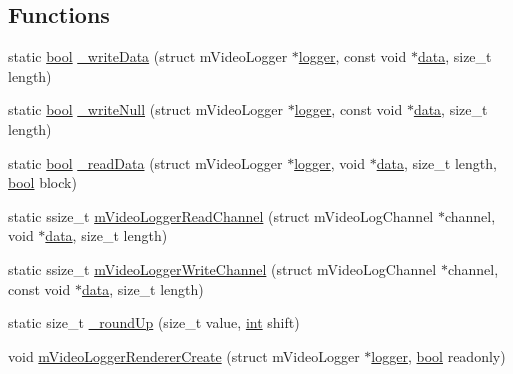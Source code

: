\subsection*{Functions}
\begin{DoxyCompactItemize}
\item 
static \mbox{\hyperlink{libretro_8h_a4a26dcae73fb7e1528214a068aca317e}{bool}} \mbox{\hyperlink{video-logger_8c_a163afd173e5992530065bb8ddc2b693e}{\+\_\+write\+Data}} (struct m\+Video\+Logger $\ast$\mbox{\hyperlink{libretro_8c_a370b093d59813e9620a3b73b831162c2}{logger}}, const void $\ast$\mbox{\hyperlink{libretro_8c_a735984d41155bc1032e09bece8f8d66d}{data}}, size\+\_\+t length)
\item 
static \mbox{\hyperlink{libretro_8h_a4a26dcae73fb7e1528214a068aca317e}{bool}} \mbox{\hyperlink{video-logger_8c_a2bb793afc8d7e37b65be24d0c0198d13}{\+\_\+write\+Null}} (struct m\+Video\+Logger $\ast$\mbox{\hyperlink{libretro_8c_a370b093d59813e9620a3b73b831162c2}{logger}}, const void $\ast$\mbox{\hyperlink{libretro_8c_a735984d41155bc1032e09bece8f8d66d}{data}}, size\+\_\+t length)
\item 
static \mbox{\hyperlink{libretro_8h_a4a26dcae73fb7e1528214a068aca317e}{bool}} \mbox{\hyperlink{video-logger_8c_abcbab73349348e3342c1e7255ed55ee4}{\+\_\+read\+Data}} (struct m\+Video\+Logger $\ast$\mbox{\hyperlink{libretro_8c_a370b093d59813e9620a3b73b831162c2}{logger}}, void $\ast$\mbox{\hyperlink{libretro_8c_a735984d41155bc1032e09bece8f8d66d}{data}}, size\+\_\+t length, \mbox{\hyperlink{libretro_8h_a4a26dcae73fb7e1528214a068aca317e}{bool}} block)
\item 
static ssize\+\_\+t \mbox{\hyperlink{video-logger_8c_aad574cf14798e8c2e42090aa1378c7fe}{m\+Video\+Logger\+Read\+Channel}} (struct m\+Video\+Log\+Channel $\ast$channel, void $\ast$\mbox{\hyperlink{libretro_8c_a735984d41155bc1032e09bece8f8d66d}{data}}, size\+\_\+t length)
\item 
static ssize\+\_\+t \mbox{\hyperlink{video-logger_8c_a4ff0364da23c84ee35e9e6cd4118a1bb}{m\+Video\+Logger\+Write\+Channel}} (struct m\+Video\+Log\+Channel $\ast$channel, const void $\ast$\mbox{\hyperlink{libretro_8c_a735984d41155bc1032e09bece8f8d66d}{data}}, size\+\_\+t length)
\item 
static size\+\_\+t \mbox{\hyperlink{video-logger_8c_a18aadf02a7a40b898d4b6d362af0e06a}{\+\_\+round\+Up}} (size\+\_\+t value, \mbox{\hyperlink{ioapi_8h_a787fa3cf048117ba7123753c1e74fcd6}{int}} shift)
\item 
void \mbox{\hyperlink{video-logger_8c_ad61ee4a99ebbf8066988b0da02c69838}{m\+Video\+Logger\+Renderer\+Create}} (struct m\+Video\+Logger $\ast$\mbox{\hyperlink{libretro_8c_a370b093d59813e9620a3b73b831162c2}{logger}}, \mbox{\hyperlink{libretro_8h_a4a26dcae73fb7e1528214a068aca317e}{bool}} readonly)

\end{DoxyCompactItemize}
